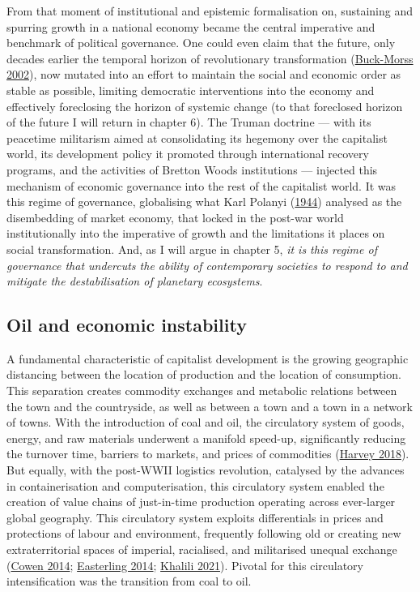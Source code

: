 \documentclass[a4paper, nobind]{templates/ociamthesis}
\begin{document}
From that moment of institutional and epistemic formalisation on, sustaining and spurring growth in a national economy became the central imperative and benchmark of political governance. One could even claim that the future, only decades earlier the temporal horizon of revolutionary transformation (\protect\hyperlink{ref-buck-morss_dreamworld_2002}{Buck-Morss 2002}), now mutated into an effort to maintain the social and economic order as stable as possible, limiting democratic interventions into the economy and effectively foreclosing the horizon of systemic change (to that foreclosed horizon of the future I will return in chapter 6). The Truman doctrine --- with its peacetime militarism aimed at consolidating its hegemony over the capitalist world, its development policy it promoted through international recovery programs, and the activities of Bretton Woods institutions --- injected this mechanism of economic governance into the rest of the capitalist world. It was this regime of governance, globalising what Karl Polanyi (\protect\hyperlink{ref-polanyi_great_1944}{1944}) analysed as the disembedding of market economy, that locked in the post-war world institutionally into the imperative of growth and the limitations it places on social transformation. And, as I will argue in chapter 5, \emph{it is this regime of governance that undercuts the ability of contemporary societies to respond to and mitigate the destabilisation of planetary ecosystems}.

\hypertarget{oil-and-economic-instability}{%
\subsection{Oil and economic instability}\label{oil-and-economic-instability}}

A fundamental characteristic of capitalist development is the growing geographic distancing between the location of production and the location of consumption. This separation creates commodity exchanges and metabolic relations between the town and the countryside, as well as between a town and a town in a network of towns. With the introduction of coal and oil, the circulatory system of goods, energy, and raw materials underwent a manifold speed-up, significantly reducing the turnover time, barriers to markets, and prices of commodities (\protect\hyperlink{ref-harvey_limits_2018}{Harvey 2018}). But equally, with the post-WWII logistics revolution, catalysed by the advances in containerisation and computerisation, this circulatory system enabled the creation of value chains of just-in-time production operating across ever-larger global geography. This circulatory system exploits differentials in prices and protections of labour and environment, frequently following old or creating new extraterritorial spaces of imperial, racialised, and militarised unequal exchange (\protect\hyperlink{ref-cowen_deadly_2014}{Cowen 2014}; \protect\hyperlink{ref-easterling_extrastatecraft_2014}{Easterling 2014}; \protect\hyperlink{ref-khalili_sinews_2021}{Khalili 2021}). Pivotal for this circulatory intensification was the transition from coal to oil.
\end{document}
